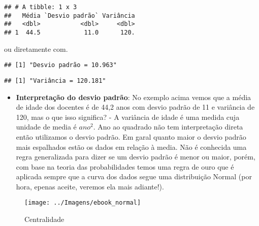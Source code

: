 \documentclass[12pt,]{style/krantz}
\makeatletter
\newenvironment{Shaded}{\begin{snugshade}}{\end{snugshade}}
\newcommand{\DecValTok}[1]{\textcolor[rgb]{0.00,0.00,0.81}{#1}}
\newcommand{\KeywordTok}[1]{\textcolor[rgb]{0.13,0.29,0.53}{\textbf{#1}}}
\newcommand{\NormalTok}[1]{#1}
\newcommand{\OperatorTok}[1]{\textcolor[rgb]{0.81,0.36,0.00}{\textbf{#1}}}
\newcommand{\StringTok}[1]{\textcolor[rgb]{0.31,0.60,0.02}{#1}}
\providecommand{\tightlist}{%
  \setlength{\itemsep}{0pt}\setlength{\parskip}{0pt}}
\newenvironment{kframe}{%
\medskip{}
\setlength{\fboxsep}{.8em}
 \def\at@end@of@kframe{}%
 \ifinner\ifhmode%
  \def\at@end@of@kframe{\end{minipage}}%
  \begin{minipage}{\columnwidth}%
 \fi\fi%
 \def\FrameCommand##1{\hskip\@totalleftmargin \hskip-\fboxsep
 \colorbox{shadecolor}{##1}\hskip-\fboxsep
     \hskip-\linewidth \hskip-\@totalleftmargin \hskip\columnwidth}%
 \MakeFramed {\advance\hsize-\width
   \@totalleftmargin\z@ \linewidth\hsize
   \@setminipage}}%
 {\par\unskip\endMakeFramed%
 \at@end@of@kframe}
\renewenvironment{Shaded}{\begin{kframe}}{\end{kframe}}
\theoremstyle{definition}
\theoremstyle{definition}
\theoremstyle{definition}
\theoremstyle{remark}
\makeatother
\begin{document}
\begin{verbatim}
## # A tibble: 1 x 3
##   Média `Desvio padrão` Variância
##   <dbl>           <dbl>     <dbl>
## 1  44.5            11.0      120.
\end{verbatim}

ou diretamente com.

\begin{Shaded}
\end{Shaded}

\begin{verbatim}
## [1] "Desvio padrão = 10.963"
\end{verbatim}

\begin{Shaded}
\end{Shaded}

\begin{verbatim}
## [1] "Variância = 120.181"
\end{verbatim}

\begin{itemize}
\tightlist
\item
  \textbf{Interpretação do desvio padrão}: No exemplo acima vemos que a média de idade dos docentes é de 44,2 anos com desvio padrão de 11 e variância de 120, mas o que isso significa? - A variância de idade é uma medida cuja unidade de media é \(ano^2\). Ano ao quadrado não tem interpretação direta então utilizamos o desvio padrão. Em garal quanto maior o desvio padrão mais espalhados estão os dados em relação à media. Não é conhecida uma regra generalizada para dizer se um desvio padrão é menor ou maior, porém, com base na teoria das probabilidades temos uma regra de ouro que é aplicada sempre que a curva dos dados segue uma distribuição Normal (por hora, epenas aceite, veremos ela mais adiante!).
\end{itemize}

\begin{figure}[H]

{\centering \texttt{[image: ../Imagens/ebook\_normal]} 

}

\caption{Centralidade}\label{fig:fig09}
\end{figure}
\end{document}
